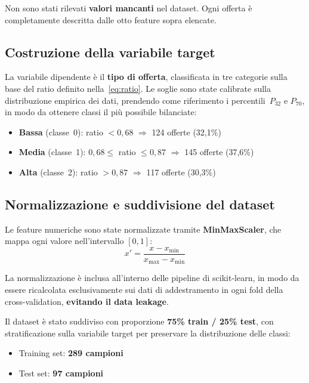 \documentclass[12pt, a4paper]{article}
\begin{document}
Non sono stati rilevati \textbf{valori mancanti} nel dataset. Ogni offerta è
completamente descritta dalle otto feature sopra elencate.

\subsection{Costruzione della variabile target}

La variabile dipendente è il \textbf{tipo di offerta}, classificata in tre
categorie sulla base del ratio definito nella~\eqref{eq:ratio}.
Le soglie sono state calibrate sulla distribuzione empirica dei dati,
prendendo come riferimento i percentili~$P_{32}$ e $P_{70}$, in modo da
ottenere classi il più possibile bilanciate:

\begin{itemize}
  \item \textbf{Bassa} (classe~0): ratio $< 0{,}68$ \quad
        $\Rightarrow$ 124 offerte (32,1\%)
  \item \textbf{Media} (classe~1): $0{,}68 \leq$ ratio $\leq 0{,}87$ \quad
        $\Rightarrow$ 145 offerte (37,6\%)
  \item \textbf{Alta} (classe~2): ratio $> 0{,}87$ \quad
        $\Rightarrow$ 117 offerte (30,3\%)
\end{itemize}

\subsection{Normalizzazione e suddivisione del dataset}

Le feature numeriche sono state normalizzate tramite \textbf{MinMaxScaler},
che mappa ogni valore nell'intervallo $[0, 1]$:
\begin{equation}
  x' = \frac{x - x_{\min}}{x_{\max} - x_{\min}}
\end{equation}

La normalizzazione è inclusa all'interno delle pipeline di scikit-learn, in modo
da essere ricalcolata esclusivamente sui dati di addestramento in ogni fold della
cross-validation, \textbf{evitando il data leakage}.

Il dataset è stato suddiviso con proporzione \textbf{75\% train / 25\% test},
con stratificazione sulla variabile target per preservare la distribuzione delle
classi:
\begin{itemize}
  \item Training set: \textbf{289 campioni}
  \item Test set: \textbf{97 campioni}
\end{itemize}
\end{document}
